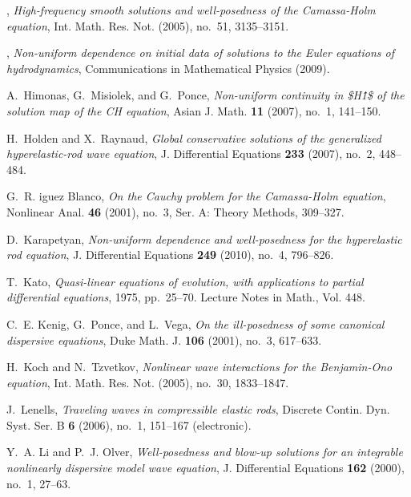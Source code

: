 \documentclass[12pt,reqno]{amsbook}
\numberwithin{section}{chapter}
\numberwithin{equation}{section}  %
\theoremstyle{remark}
\begin{document}
\begin{thebibliography}{HIKK10}
\bysame, \emph{{High-frequency smooth solutions and well-posedness of the
  Camassa-Holm equation}}, Int. Math. Res. Not. (2005), no.~51, 3135--3151.

\bysame, \emph{{Non-uniform dependence on initial data of solutions to the
  Euler equations of hydrodynamics}}, Communications in Mathematical Physics
  (2009).

A.~Himonas, G.~Misiolek, and G.~Ponce, \emph{{Non-uniform continuity in {\$}H\^
  1{\$} of the solution map of the CH equation}}, Asian J. Math. \textbf{11}
  (2007), no.~1, 141--150.

H.~Holden and X.~Raynaud, \emph{{Global conservative solutions of the
  generalized hyperelastic-rod wave equation}}, J. Differential Equations
  \textbf{233} (2007), no.~2, 448--484.

G.~R. iguez Blanco, \emph{{On the Cauchy problem for the Camassa-Holm
  equation}}, Nonlinear Anal. \textbf{46} (2001), no.~3, Ser. A: Theory
  Methods, 309--327.

D.~Karapetyan, \emph{{Non-uniform dependence and well-posedness for the
  hyperelastic rod equation}}, J. Differential Equations \textbf{249} (2010),
  no.~4, 796--826.

T.~Kato, \emph{{Quasi-linear equations of evolution, with applications to
  partial differential equations}}, 1975, pp.~25--70. Lecture Notes in Math.,
  Vol. 448.

C.~E. Kenig, G.~Ponce, and L.~Vega, \emph{{On the ill-posedness of some
  canonical dispersive equations}}, Duke Math. J. \textbf{106} (2001), no.~3,
  617--633.

H.~Koch and N.~Tzvetkov, \emph{{Nonlinear wave interactions for the
  Benjamin-Ono equation}}, Int. Math. Res. Not. (2005), no.~30, 1833--1847.

J.~Lenells, \emph{{Traveling waves in compressible elastic rods}}, Discrete
  Contin. Dyn. Syst. Ser. B \textbf{6} (2006), no.~1, 151--167 (electronic).

Y.~A. Li and P.~J. Olver, \emph{{Well-posedness and blow-up solutions for an
  integrable nonlinearly dispersive model wave equation}}, J. Differential
  Equations \textbf{162} (2000), no.~1, 27--63.


\end{thebibliography}
\end{document}
